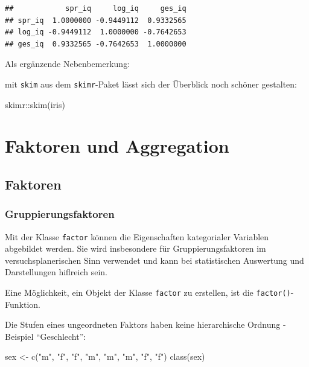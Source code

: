 \documentclass[
]{book}
\newenvironment{Shaded}{\begin{snugshade}}{\end{snugshade}}
\newcommand{\FunctionTok}[1]{\textcolor[rgb]{0.00,0.00,0.00}{#1}}
\newcommand{\NormalTok}[1]{#1}
\newcommand{\OtherTok}[1]{\textcolor[rgb]{0.56,0.35,0.01}{#1}}
\newcommand{\SpecialCharTok}[1]{\textcolor[rgb]{0.00,0.00,0.00}{#1}}
\newcommand{\StringTok}[1]{\textcolor[rgb]{0.31,0.60,0.02}{#1}}
\begin{document}
\begin{verbatim}
##            spr_iq     log_iq     ges_iq
## spr_iq  1.0000000 -0.9449112  0.9332565
## log_iq -0.9449112  1.0000000 -0.7642653
## ges_iq  0.9332565 -0.7642653  1.0000000
\end{verbatim}

Als ergänzende Nebenbemerkung:

mit \texttt{skim} aus dem \texttt{skimr}-Paket lässt sich der Überblick noch schöner gestalten:

\begin{Shaded}
\begin{Highlighting}[]
\NormalTok{skimr}\SpecialCharTok{::}\FunctionTok{skim}\NormalTok{(iris)}
\end{Highlighting}
\end{Shaded}

\hypertarget{faktoren-und-aggregation}{%
\chapter{Faktoren und Aggregation}\label{faktoren-und-aggregation}}

\hypertarget{faktoren}{%
\section{Faktoren}\label{faktoren}}

\hypertarget{gruppierungsfaktoren}{%
\subsection{Gruppierungsfaktoren}\label{gruppierungsfaktoren}}

Mit der Klasse \texttt{factor} können die Eigenschaften kategorialer Variablen abgebildet werden. Sie wird insbesondere für Gruppierungsfaktoren im versuchsplanerischen Sinn verwendet und kann bei statistischen Auswertung und Darstellungen hiflreich sein.

Eine Möglichkeit, ein Objekt der Klasse \texttt{factor} zu erstellen, ist die \texttt{factor()}-Funktion.

Die Stufen eines ungeordneten Faktors haben keine hierarchische Ordnung - Beispiel ``Geschlecht'':

\begin{Shaded}
\begin{Highlighting}[]
\NormalTok{sex }\OtherTok{\textless{}{-}} \FunctionTok{c}\NormalTok{(}\StringTok{"m"}\NormalTok{, }\StringTok{"f"}\NormalTok{, }\StringTok{"f"}\NormalTok{, }\StringTok{"m"}\NormalTok{, }\StringTok{"m"}\NormalTok{, }\StringTok{"m"}\NormalTok{, }\StringTok{"f"}\NormalTok{, }\StringTok{"f"}\NormalTok{)}
\FunctionTok{class}\NormalTok{(sex)}
\end{Highlighting}
\end{Shaded}
\end{document}
